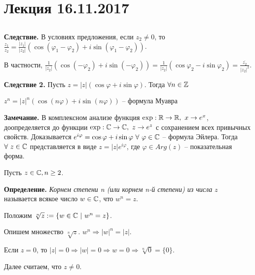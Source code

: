 \section{Лекция 16.11.2017}

\subsection{}

\textbf{Следствие.} В условиях предложения, если $z_2 \neq 0$, то $\frac{z_1}{z_2} = \frac{|z_1|}{|z_2|} (\cos (\varphi_1 - \varphi_2) + i \sin(\varphi_1 - \varphi_2))$.

\vspace{\baselineskip}
В частности, $\frac{1}{|z_2|}(\cos(- \varphi_2) + i\sin(- \varphi_2)) = \frac{1}{|z_2|}(\cos \varphi_2 - i \sin \varphi_2) = \frac{\overline{z_2}}{|z_2|^2}$.

\vspace{\baselineskip}
\textbf{Следствие 2.} Пусть $z = |z|(\cos \varphi + i \sin \varphi)$. Тогда $\forall n \in \mathbb{Z}$

\vspace{\baselineskip}
$z^n = |z|^n (\cos(n \varphi) + i \sin(n \varphi))$ -- формула Муавра

\vspace{\baselineskip}
\textbf{Замечание.} В комплексном анализе функция $\exp: \mathbb{R} \rightarrow \mathbb{R}, \ x \rightarrow e^x$, доопределяется до функции $\exp: \mathbb{C} \rightarrow \mathbb{C}, \ z \rightarrow e^z$ с сохранением всех привычных свойств. Доказывается $e^{i \varphi} = \cos \varphi + i \sin \varphi \ \forall \ \varphi \in \mathbb{C}$ -- формула Эйлера. Тогда $\forall \ z \in \mathbb{C}$ представляется в виде $z = |z| e^{i \varphi}$, где $\varphi \in Arg(z)$ -- показательная форма.

\vspace{\baselineskip}
Пусть $z \in \mathbb{C}, n \geq 2$.

\textbf{Определение.} \textit{Корнем степени n (или корнем n-й степени) из числа} $z$ называется всякое число $w \in \mathbb{C}$, что $w^n = z$.

Положим $\sqrt[n]{z} := \{w \in \CC \ | \ w^n = z \}$.

\vspace{\baselineskip}
Опишем множество $\sqrt[n]{z}$.
$w^n \Rightarrow |w|^n = |z|$.

Если $z = 0$, то $|z| = 0 \Rightarrow |w| = 0 \Rightarrow w = 0 \Rightarrow \sqrt[n]{0} = \{ 0 \}$. 

Далее считаем, что $z \neq 0$.

